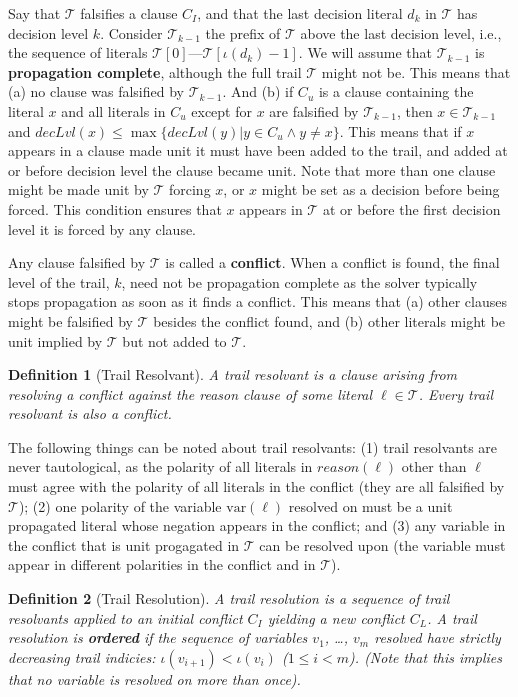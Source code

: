 \documentclass[runningheads]{llncs}
\newcommand{\trail}{\ensuremath{\mathcal{T}}}
\newcommand{\trailIdx}[1]{\ensuremath{\iota(#1)}}
\newcommand{\dlevel}[1]{\ensuremath{\mathit{decLvl}(#1)}}
\newcommand{\var}{\text{var}}
\newcommand{\reason}[1]{\ensuremath{\mathit{reason}(#1)}}
\newtheorem{defn}{Definition}
\begin{document}
Say that $\trail$ falsifies a clause $C_I$, and that the last decision
literal $d_k$ in $\trail$ has decision level $k$. Consider
$\trail_{k-1}$ the prefix of $\trail$ above the last decision level,
i.e., the sequence of literals
$\trail[0]$---$\trail[\trailIdx{d_k}-1]$. We will assume that
$\trail_{k-1}$ is \textbf{propagation complete}, although the full
trail $\trail$ might not be. This means that (a) no clause was
falsified by $\trail_{k-1}$. And (b) if $C_u$ is a clause containing
the literal $x$ and all literals in $C_u$ except for $x$ are falsified
by $\trail_{k-1}$, then $x\in \trail_{k-1}$ and
$\dlevel{x} \leq\max\{\dlevel{y} | y\in C_u \land y\neq x\}$. This
means that if $x$ appears in a clause made unit it must have been
added to the trail, and added at or before decision level the clause
became unit. Note that more than one clause might be made unit by
$\trail$ forcing $x$, or $x$ might be set as a decision before being
forced. This condition ensures that $x$ appears in $\trail$ at or
before the first decision level it is forced by any clause.

Any clause falsified by $\trail$ is called a \textbf{conflict}. When a
conflict is found, the final level of the trail, $k$, need not be
propagation complete as the solver typically stops propagation as soon
as it finds a conflict. This means that (a) other clauses might be
falsified by $\trail$ besides the conflict found, and (b) other
literals might be unit implied by $\trail$ but not added to $\trail$.

\begin{defn}[Trail Resolvant]
    A trail resolvant is a clause arising from resolving a conflict
    against the reason clause of some literal $\ell \in \trail$. Every
    trail resolvant is also a conflict.
\end{defn}

The following things can be noted about trail resolvants: (1) trail
resolvants are never tautological, as the polarity of all literals in
$\reason{\ell}$ other than $\ell$ must agree with the polarity of all
literals in the conflict (they are all falsified by $\trail$); (2) one
polarity of the variable $\var(\ell)$ resolved on must be a unit
propagated literal whose negation appears in the conflict; and (3) any
variable in the conflict that is unit progagated in $\trail$ can be
resolved upon (the variable must appear in different polarities in the
conflict and in $\trail$).

\begin{defn}[Trail Resolution]
    A trail resolution is a sequence of trail resolvants applied to an
    initial conflict $C_I$ yielding a new conflict $C_L$.  A trail
    resolution is \textbf{ordered} if the sequence of variables $v_1$,
    \dots, $v_m$ resolved have strictly decreasing trail indicies:
    $\trailIdx{v_{i+1}} < \trailIdx{v_i}$ ($1\leq i < m$). (Note that
    this implies that no variable is resolved on more than once).
\end{defn}
\end{document}
